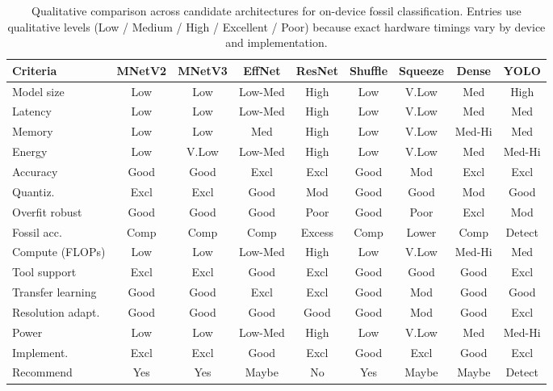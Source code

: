 \documentclass[a4paper,fleqn]{cas-sc}
\begin{document}
\begin{table}[htbp]
\centering
\scriptsize
\setlength{\tabcolsep}{3pt}
\renewcommand{\arraystretch}{1.05}

\caption{Qualitative comparison across candidate architectures for on-device fossil classification. Entries use qualitative levels (Low / Medium / High / Excellent / Poor) because exact hardware timings vary by device and implementation.}
\label{tab_comparison}

\begin{tabular}{p{2.4cm}cccccccc}
\toprule
\textbf{Criteria} & \textbf{MNetV2} & \textbf{MNetV3} & \textbf{EffNet} & \textbf{ResNet} & \textbf{Shuffle} & \textbf{Squeeze} & \textbf{Dense} & \textbf{YOLO} \\
\midrule
Model size & Low & Low & Low-Med & High & Low & V.Low & Med & High \\
Latency & Low & Low & Low-Med & High & Low & V.Low & Med & Med \\
Memory & Low & Low & Med & High & Low & V.Low & Med-Hi & Med \\
Energy & Low & V.Low & Low-Med & High & Low & V.Low & Med & Med-Hi \\
Accuracy & Good & Good & Excl & Excl & Good & Mod & Excl & Excl \\
Quantiz. & Excl & Excl & Good & Mod & Good & Good & Mod & Good \\
Overfit robust & Good & Good & Good & Poor & Good & Poor & Excl & Mod \\
Fossil acc. & Comp & Comp & Comp & Excess & Comp & Lower & Comp & Detect \\
\midrule
Compute (FLOPs) & Low & Low & Low-Med & High & Low & V.Low & Med-Hi & Med \\
Tool support & Excl & Excl & Good & Excl & Good & Good & Good & Excl \\
Transfer learning & Good & Good & Excl & Excl & Good & Mod & Good & Good \\
Resolution adapt. & Good & Good & Good & Good & Good & Mod & Good & Excl \\
\midrule
Power & Low & Low & Low-Med & High & Low & V.Low & Med & Med-Hi \\
Implement. & Excl & Excl & Good & Excl & Good & Excl & Good & Excl \\
Recommend & Yes & Yes & Maybe & No & Yes & Maybe & Maybe & Detect \\
\bottomrule
\end{tabular}
\end{table}
\end{document}
